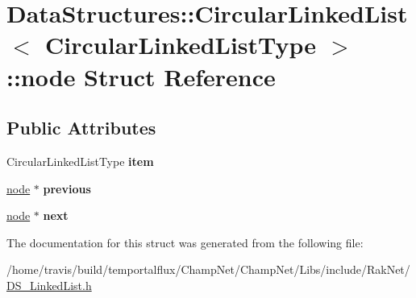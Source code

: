 \hypertarget{struct_data_structures_1_1_circular_linked_list_1_1node}{\section{Data\-Structures\-:\-:Circular\-Linked\-List$<$ Circular\-Linked\-List\-Type $>$\-:\-:node Struct Reference}
\label{struct_data_structures_1_1_circular_linked_list_1_1node}
}
\subsection*{Public Attributes}
\begin{DoxyCompactItemize}
\item 
\hypertarget{struct_data_structures_1_1_circular_linked_list_1_1node_a1b20aa76186c8a46ba105ef014f52a72}{Circular\-Linked\-List\-Type {\bfseries item}}\label{struct_data_structures_1_1_circular_linked_list_1_1node_a1b20aa76186c8a46ba105ef014f52a72}

\item 
\hypertarget{struct_data_structures_1_1_circular_linked_list_1_1node_aed79ace8e22957d4eeaeb7bf1e72fb1f}{\hyperlink{struct_data_structures_1_1_circular_linked_list_1_1node}{node} $\ast$ {\bfseries previous}}\label{struct_data_structures_1_1_circular_linked_list_1_1node_aed79ace8e22957d4eeaeb7bf1e72fb1f}

\item 
\hypertarget{struct_data_structures_1_1_circular_linked_list_1_1node_aaeb346cc2e95d9ed271aef6018f77b4c}{\hyperlink{struct_data_structures_1_1_circular_linked_list_1_1node}{node} $\ast$ {\bfseries next}}\label{struct_data_structures_1_1_circular_linked_list_1_1node_aaeb346cc2e95d9ed271aef6018f77b4c}

\end{DoxyCompactItemize}


The documentation for this struct was generated from the following file\-:\begin{DoxyCompactItemize}
\item 
/home/travis/build/temportalflux/\-Champ\-Net/\-Champ\-Net/\-Libs/include/\-Rak\-Net/\hyperlink{_d_s___linked_list_8h}{D\-S\-\_\-\-Linked\-List.\-h}\end{DoxyCompactItemize}
